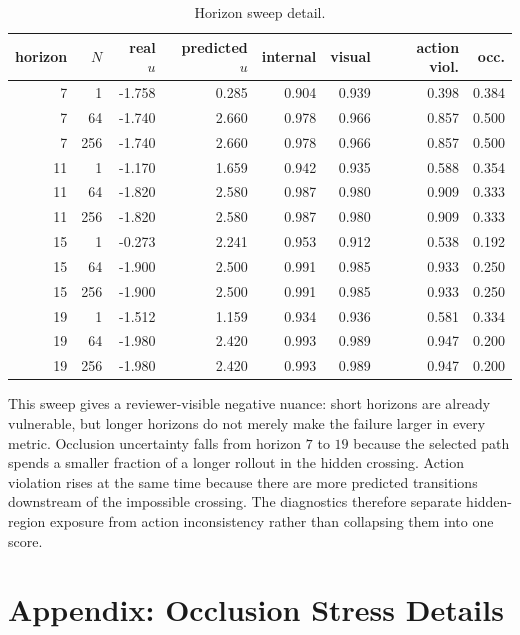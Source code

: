 \documentclass{article}
\begin{document}
\begin{table}[tbp]
  \centering
  \small
  \caption{Horizon sweep detail.}
  \label{tab:horizon-full}
  \begin{tabular}{@{}rrrrrrrr@{}}
    \toprule
    horizon & \(N\) & real \(u\) & predicted \(u\) & internal & visual & action viol. & occ. \\
    \midrule
    7 & 1 & -1.758 & 0.285 & 0.904 & 0.939 & 0.398 & 0.384 \\
    7 & 64 & -1.740 & 2.660 & 0.978 & 0.966 & 0.857 & 0.500 \\
    7 & 256 & -1.740 & 2.660 & 0.978 & 0.966 & 0.857 & 0.500 \\
    11 & 1 & -1.170 & 1.659 & 0.942 & 0.935 & 0.588 & 0.354 \\
    11 & 64 & -1.820 & 2.580 & 0.987 & 0.980 & 0.909 & 0.333 \\
    11 & 256 & -1.820 & 2.580 & 0.987 & 0.980 & 0.909 & 0.333 \\
    15 & 1 & -0.273 & 2.241 & 0.953 & 0.912 & 0.538 & 0.192 \\
    15 & 64 & -1.900 & 2.500 & 0.991 & 0.985 & 0.933 & 0.250 \\
    15 & 256 & -1.900 & 2.500 & 0.991 & 0.985 & 0.933 & 0.250 \\
    19 & 1 & -1.512 & 1.159 & 0.934 & 0.936 & 0.581 & 0.334 \\
    19 & 64 & -1.980 & 2.420 & 0.993 & 0.989 & 0.947 & 0.200 \\
    19 & 256 & -1.980 & 2.420 & 0.993 & 0.989 & 0.947 & 0.200 \\
    \bottomrule
  \end{tabular}
\end{table}

This sweep gives a reviewer-visible negative nuance: short horizons are already vulnerable, but longer horizons do not merely make the failure larger in every metric. Occlusion uncertainty falls from horizon \(7\) to \(19\) because the selected path spends a smaller fraction of a longer rollout in the hidden crossing. Action violation rises at the same time because there are more predicted transitions downstream of the impossible crossing. The diagnostics therefore separate hidden-region exposure from action inconsistency rather than collapsing them into one score.

\section{Appendix: Occlusion Stress Details}
\label{app:occlusion-details}
\end{document}
